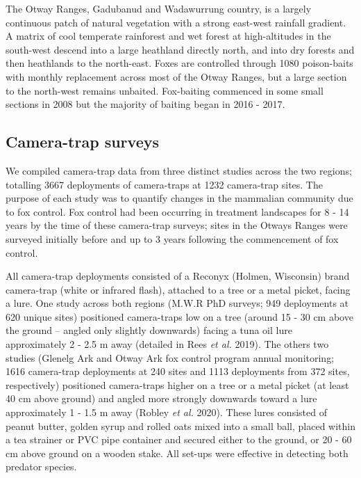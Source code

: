 \documentclass[11pt,a4paper,titlepage,twoside,openright]{style/unimelbthesis}
\begin{document}
\begin{mainmatter}
The Otway Ranges, Gadubanud and Wadawurrung country, is a largely continuous patch of natural vegetation with a strong east-west rainfall gradient. A matrix of cool temperate rainforest and wet forest at high-altitudes in the south-west descend into a large heathland directly north, and into dry forests and then heathlands to the north-east. Foxes are controlled through 1080 poison-baits with monthly replacement across most of the Otway Ranges, but a large section to the north-west remains unbaited. Fox-baiting commenced in some small sections in 2008 but the majority of baiting began in 2016 - 2017.

\hypertarget{camera-trap-surveys-1}{%
\subsection{Camera-trap surveys}\label{camera-trap-surveys-1}}

We compiled camera-trap data from three distinct studies across the two regions; totalling 3667 deployments of camera-traps at 1232 camera-trap sites. The purpose of each study was to quantify changes in the mammalian community due to fox control. Fox control had been occurring in treatment landscapes for 8 - 14 years by the time of these camera-trap surveys; sites in the Otways Ranges were surveyed initially before and up to 3 years following the commencement of fox control.

All camera-trap deployments consisted of a Reconyx (Holmen, Wisconsin) brand camera-trap (white or infrared flash), attached to a tree or a metal picket, facing a lure. One study across both regions (M.W.R PhD surveys; 949 deployments at 620 unique sites) positioned camera-traps low on a tree (around 15 - 30 cm above the ground -- angled only slightly downwards) facing a tuna oil lure approximately 2 - 2.5 m away (detailed in Rees \emph{et al.} 2019). The others two studies (Glenelg Ark and Otway Ark fox control program annual monitoring; 1616 camera-trap deployments at 240 sites and 1113 deployments from 372 sites, respectively) positioned camera-traps higher on a tree or a metal picket (at least 40 cm above ground) and angled more strongly downwards toward a lure approximately 1 - 1.5 m away (Robley \emph{et al.} 2020). These lures consisted of peanut butter, golden syrup and rolled oats mixed into a small ball, placed within a tea strainer or PVC pipe container and secured either to the ground, or 20 - 60 cm above ground on a wooden stake. All set-ups were effective in detecting both predator species.


\end{mainmatter}
\end{document}
